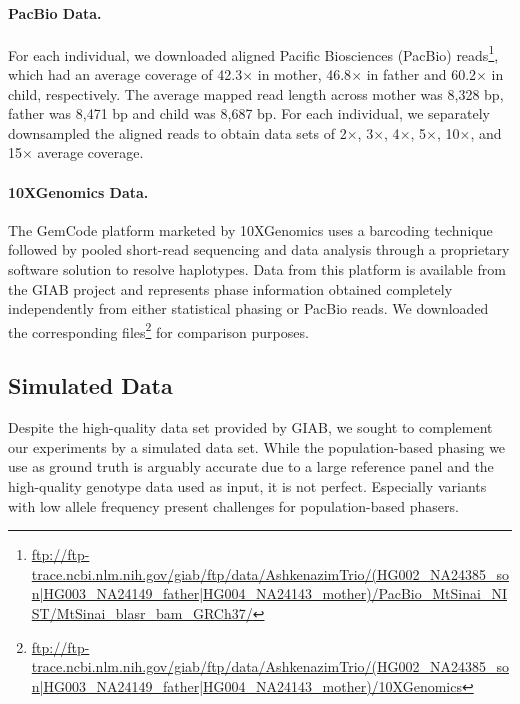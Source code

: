 \paragraph{PacBio Data.} For each individual, we downloaded aligned Pacific Biosciences (PacBio) reads\footnote{\scriptsize{\url{ftp://ftp-trace.ncbi.nlm.nih.gov/giab/ftp/data/AshkenazimTrio/(HG002_NA24385_son|HG003_NA24149_father|HG004_NA24143_mother)/PacBio_MtSinai_NIST/MtSinai_blasr_bam_GRCh37/}}},  
which had an average coverage of 42.3$\times$ in mother, 46.8$\times$ in father and 60.2$\times$ in child, respectively.
The average mapped read length across mother was 8,328 bp, father was 8,471 bp and child was 8,687 bp.
For each individual, we separately downsampled the aligned reads to obtain data sets of 2$\times$, 3$\times$, 4$\times$, 5$\times$, 10$\times$, and 15$\times$ average coverage.

\paragraph{10XGenomics Data.}
The GemCode platform marketed by 10XGenomics uses a barcoding technique followed by pooled short-read sequencing and data analysis through a proprietary software solution to resolve haplotypes.
Data from this platform is available from the GIAB project and represents phase information obtained completely independently from either statistical phasing or PacBio reads.
We downloaded the corresponding files\footnote{\scriptsize{\url{ftp://ftp-trace.ncbi.nlm.nih.gov/giab/ftp/data/AshkenazimTrio/(HG002_NA24385_son|HG003_NA24149_father|HG004_NA24143_mother)/10XGenomics}}} for comparison purposes.

\subsection{Simulated Data}
Despite the high-quality data set provided by GIAB, we sought to complement our experiments by a simulated data set.
While the population-based phasing we use as ground truth is arguably accurate due to a large reference panel and the high-quality genotype data used as input, it is not perfect.
Especially variants with low allele frequency present challenges for population-based phasers.

